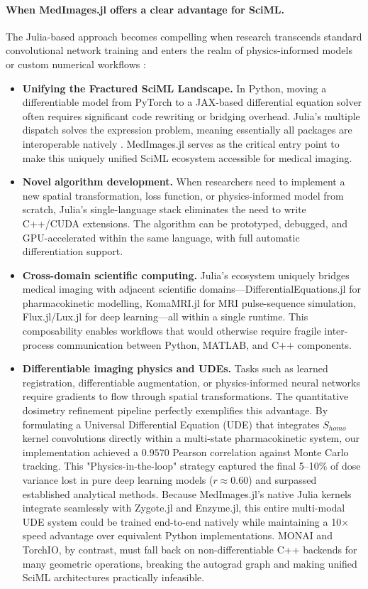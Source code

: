 \documentclass[10pt,letterpaper]{article}
\begin{document}
\paragraph{When MedImages.jl offers a clear advantage for SciML.}
The Julia-based approach becomes compelling when research transcends standard convolutional network training and enters the realm of physics-informed models or custom numerical workflows \cite{RoeschGreener2023}:
\begin{itemize}
    \item \textbf{Unifying the Fractured SciML Landscape.} In Python, moving a differentiable model from PyTorch to a JAX-based differential equation solver often requires significant code rewriting or bridging overhead. Julia's multiple dispatch solves the expression problem, meaning essentially all packages are interoperable natively \cite{PalBhattacharya2024, EschleGl2023}. MedImages.jl serves as the critical entry point to make this uniquely unified SciML ecosystem accessible for medical imaging.
    \item \textbf{Novel algorithm development.} When researchers need to implement a new spatial transformation, loss function, or physics-informed model from scratch, Julia's single-language stack eliminates the need to write C++/CUDA extensions. The algorithm can be prototyped, debugged, and GPU-accelerated within the same language, with full automatic differentiation support.
    \item \textbf{Cross-domain scientific computing.} Julia's ecosystem uniquely bridges medical imaging with adjacent scientific domains---DifferentialEquations.jl for pharmacokinetic modelling, KomaMRI.jl \cite{CastilloPassiCoronado2023} for MRI pulse-sequence simulation, Flux.jl/Lux.jl \cite{pal2023lux} for deep learning---all within a single runtime. This composability enables workflows that would otherwise require fragile inter-process communication between Python, MATLAB, and C++ components.
    \item \textbf{Differentiable imaging physics and UDEs.} Tasks such as learned registration, differentiable augmentation, or physics-informed neural networks require gradients to flow through spatial transformations. The quantitative dosimetry refinement pipeline perfectly exemplifies this advantage. By formulating a Universal Differential Equation (UDE) that integrates $S_{homo}$ kernel convolutions directly within a multi-state pharmacokinetic system, our implementation achieved a $0.9570$ Pearson correlation against Monte Carlo tracking. This "Physics-in-the-loop" strategy captured the final 5--10\% of dose variance lost in pure deep learning models ($r \approx 0.60$) and surpassed established analytical methods. Because MedImages.jl's native Julia kernels integrate seamlessly with Zygote.jl and Enzyme.jl, this entire multi-modal UDE system could be trained end-to-end natively while maintaining a 10$\times$ speed advantage over equivalent Python implementations. MONAI and TorchIO, by contrast, must fall back on non-differentiable C++ backends for many geometric operations, breaking the autograd graph and making unified SciML architectures practically infeasible.
\end{itemize}
\end{document}
